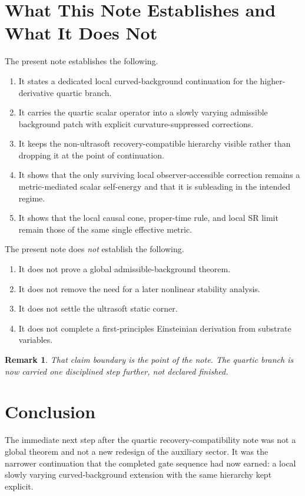 \documentclass[11pt]{article}
\newtheorem{remark}{Remark}
\begin{document}
\section{What This Note Establishes and What It Does Not}

The present note establishes the following.
\begin{enumerate}
    \item It states a dedicated local curved-background continuation for the higher-derivative quartic branch.
    \item It carries the quartic scalar operator into a slowly varying admissible background patch with explicit curvature-suppressed corrections.
    \item It keeps the non-ultrasoft recovery-compatible hierarchy visible rather than dropping it at the point of continuation.
    \item It shows that the only surviving local observer-accessible correction remains a metric-mediated scalar self-energy and that it is subleading in the intended regime.
    \item It shows that the local causal cone, proper-time rule, and local SR limit remain those of the same single effective metric.
\end{enumerate}

The present note does \emph{not} establish the following.
\begin{enumerate}
    \item It does not prove a global admissible-background theorem.
    \item It does not remove the need for a later nonlinear stability analysis.
    \item It does not settle the ultrasoft static corner.
    \item It does not complete a first-principles Einsteinian derivation from substrate variables.
\end{enumerate}

\begin{remark}
That claim boundary is the point of the note. The quartic branch is now carried one disciplined step further, not declared finished.
\end{remark}

\section{Conclusion}

The immediate next step after the quartic recovery-compatibility note was not a global theorem and not a new redesign of the auxiliary sector. It was the narrower continuation that the completed gate sequence had now earned: a local slowly varying curved-background extension with the same hierarchy kept explicit.
\end{document}
